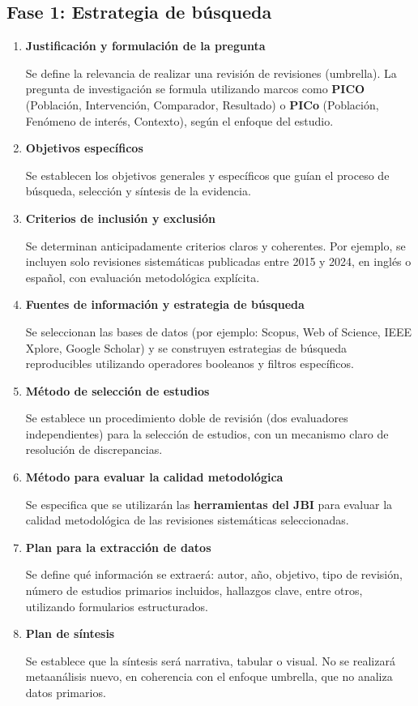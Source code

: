 \subsection*{Fase 1: Estrategia de búsqueda}

\begin{enumerate}
    \item \textbf{Justificación y formulación de la pregunta}

    Se define la relevancia de realizar una revisión de revisiones (umbrella). La pregunta de investigación se formula utilizando marcos como \textbf{PICO} (Población, Intervención, Comparador, Resultado) o \textbf{PICo} (Población, Fenómeno de interés, Contexto), según el enfoque del estudio.

    \item \textbf{Objetivos específicos}

    Se establecen los objetivos generales y específicos que guían el proceso de búsqueda, selección y síntesis de la evidencia.

    \item \textbf{Criterios de inclusión y exclusión}

    Se determinan anticipadamente criterios claros y coherentes. Por ejemplo, se incluyen solo revisiones sistemáticas publicadas entre 2015 y 2024, en inglés o español, con evaluación metodológica explícita.

    \item \textbf{Fuentes de información y estrategia de búsqueda}

    Se seleccionan las bases de datos (por ejemplo: Scopus, Web of Science, IEEE Xplore, Google Scholar) y se construyen estrategias de búsqueda reproducibles utilizando operadores booleanos y filtros específicos.

    \item \textbf{Método de selección de estudios}

    Se establece un procedimiento doble de revisión (dos evaluadores independientes) para la selección de estudios, con un mecanismo claro de resolución de discrepancias.

    \item \textbf{Método para evaluar la calidad metodológica}

    Se especifica que se utilizarán las \textbf{herramientas del JBI} para evaluar la calidad metodológica de las revisiones sistemáticas seleccionadas.

    \item \textbf{Plan para la extracción de datos}

    Se define qué información se extraerá: autor, año, objetivo, tipo de revisión, número de estudios primarios incluidos, hallazgos clave, entre otros, utilizando formularios estructurados.

    \item \textbf{Plan de síntesis}

    Se establece que la síntesis será narrativa, tabular o visual. No se realizará metaanálisis nuevo, en coherencia con el enfoque umbrella, que no analiza datos primarios.
\end{enumerate}

